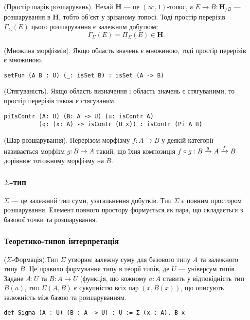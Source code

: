 \begin{definition} (Простір шарів розшарувань).
Нехай $\mathbf{H}$ --- це $(\infty,1)$-топос, а $E \rightarrow B : \mathbf{H}_{/B}$ ---  розшарування в
$\mathbf{H}$, тобто об'єкт у зрізаному топосі.  Тоді простір перерізів $\Gamma_\Sigma(E)$
цього розшарування є залежним добутком:
$$ \Gamma_\Sigma(E) = \Pi_\Sigma (E) \in \mathbf{H}. $$
\end{definition}

\begin{theorem} (Множина морфізмів).
Якщо область значень є множиною, тоді простір перерізів є множиною.
\begin{lstlisting}
setFun (A B : U) (_: isSet B) : isSet (A -> B)
\end{lstlisting}
\end{theorem}

\begin{theorem} (Стягуваність).
Якщо область визначення і область значень є стягуваними, то простір перерізів також є стягуваним.
\begin{lstlisting}
piIsContr (A: U) (B: A -> U) (u: isContr A)
          (q: (x: A) -> isContr (B x)) : isContr (Pi A B)
\end{lstlisting}
\end{theorem}

\begin{definition} (Шар розшарування).
Перерізом морфізму $f: A \rightarrow B$ у деякій категорії називається морфізм $g: B \rightarrow A$
такий, що їхня композиція $f \circ g: B \xrightarrow{{g}} A \xrightarrow{{f}} B$ дорівнює тотожному морфізму на $B$.
\end{definition}

\newpage
\subsubsection{$\Sigma$-тип}
$\Sigma$ --- це залежний тип суми, узагальнення добутків.
Тип $\Sigma$ є повним простором розшарування.
Елемент повного простору формується як пара, що складається з базової точки та розшарування.



\subsubsection{Теоретико-типов інтерпретація}

\begin{definition} ($\Sigma$-Формація).Тип $\Sigma$ утворює залежну суму для базового типу $A$ та залежного типу $B$.
Це правило формування типу в теорії типів, де $U$ — універсум типів. Задане $A:U$ та $B:A\rightarrow U$
(функція, що кожному $a:A$ ставить у відповідність тип $B(a)$, тип $\Sigma(A,B)$ є сукупністю всіх пар $(x,B(x))$,
що описують залежність між базою та розшаруванням.
\begin{lstlisting}
def Sigma (A : U) (B : A -> U) : U := Σ (x : A), B x
\end{lstlisting}
\end{definition}

